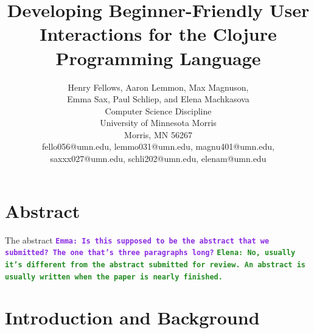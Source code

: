 \documentclass[12pt]{article}
\newcommand{\comment}[1]{{\bf \tt  {#1}}}
\newcommand{\emcomment}[1]{\textcolor{ForestGreen}{\comment{Elena: {#1}}}}
\newcommand{\escomment}[1]{\textcolor{BlueViolet}{\comment{Emma: {#1}}}}
\begin{document}
\pagestyle{plain}
%

\title{Developing Beginner-Friendly User Interactions for the Clojure Programming Language}
%
%

\author{
Henry Fellows, Aaron Lemmon, Max Magnuson, \\
	Emma Sax, Paul Schliep, and Elena Machkasova \\
Computer Science Discipline \\
University of Minnesota Morris\\
Morris, MN 56267\\
fello056@umn.edu, lemmo031@umn.edu, magnu401@umn.edu, \\
	saxxx027@umn.edu, schli202@umn.edu, elenam@umn.edu
}
\date{}
\maketitle
\thispagestyle{empty}

\section*{\centering Abstract}
The abstract
\escomment{Is this supposed to be the abstract that we submitted? The
  one that's three paragraphs long?}
\emcomment{No, usually it's different from the abstract submitted for
  review. An abstract is usually written when the paper is nearly
  finished.}

\newpage
\setcounter{page}{1}

\section{Introduction and Background}\label{sec:intro}
\end{document}
